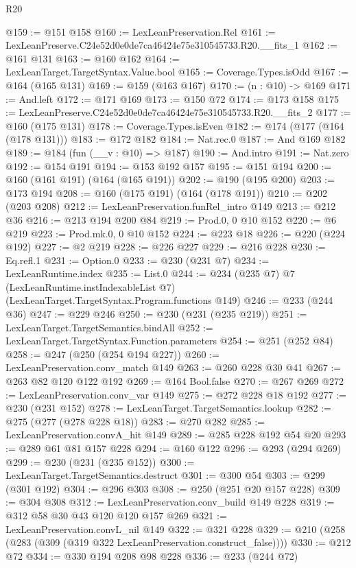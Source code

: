 \begin{lexlean}{R20}
\begin{coremodule}
@159 := @151 @158
@160 := LexLeanPreservation.Rel
@161 := LexLeanPreserve.C24e52d0e0de7ca46424e75e310545733.R20.__fits_1
@162 := @161 @131
@163 := @160 @162
@164 := LexLeanTarget.TargetSyntax.Value.bool
@165 := Coverage.Types.isOdd
@167 := @164 (@165 @131)
@169 := @159 (@163 @167)
@170 := (n : @10) -> @169
@171 := And.left
@172 := @171 @169
@173 := @150 @72
@174 := @173 @158
@175 := LexLeanPreserve.C24e52d0e0de7ca46424e75e310545733.R20.__fits_2
@177 := @160 (@175 @131)
@178 := Coverage.Types.isEven
@182 := @174 (@177 (@164 (@178 @131)))
@183 := @172 @182
@184 := Nat.rec.{0}
@187 := And @169 @182
@189 := @184 (fun (__v : @10) => @187)
@190 := And.intro
@191 := Nat.zero
@192 := @154 @191
@194 := @153 @192 @157
@195 := @151 @194
@200 := @160 (@161 @191) (@164 (@165 @191))
@202 := @190 (@195 @200)
@203 := @173 @194
@208 := @160 (@175 @191) (@164 (@178 @191))
@210 := @202 (@203 @208)
@212 := LexLeanPreservation.funRel_intro @149
@213 := @212 @36
@216 := @213 @194 @200 @84
@219 := Prod.{0, 0} @10 @152
@220 := @6 @219
@223 := Prod.mk.{0, 0} @10 @152
@224 := @223 @18
@226 := @220 (@224 @192)
@227 := @2 @219
@228 := @226 @227
@229 := @216 @228
@230 := Eq.refl.{1}
@231 := Option.{0}
@233 := @230 (@231 @7)
@234 := LexLeanRuntime.index
@235 := List.{0}
@244 := @234
    (@235 @7)
    @7
    (LexLeanRuntime.instIndexableList @7)
    (LexLeanTarget.TargetSyntax.Program.functions @149)
@246 := @233 (@244 @36)
@247 := @229 @246
@250 := @230 (@231 (@235 @219))
@251 := LexLeanTarget.TargetSemantics.bindAll
@252 := LexLeanTarget.TargetSyntax.Function.parameters
@254 := @251 (@252 @84)
@258 := @247 (@250 (@254 @194 @227))
@260 := LexLeanPreservation.conv_match @149
@263 := @260 @228 @30 @41
@267 := @263 @82 @120 @122 @192
@269 := @164 Bool.false
@270 := @267 @269
@272 := LexLeanPreservation.conv_var @149
@275 := @272 @228 @18 @192
@277 := @230 (@231 @152)
@278 := LexLeanTarget.TargetSemantics.lookup
@282 := @275 (@277 (@278 @228 @18))
@283 := @270 @282
@285 := LexLeanPreservation.convA_hit @149
@289 := @285 @228 @192 @54 @20
@293 := @289 @61 @81 @157 @228
@294 := @160 @122
@296 := @293 (@294 @269)
@299 := @230 (@231 (@235 @152))
@300 := LexLeanTarget.TargetSemantics.destruct
@301 := @300 @54
@303 := @299 (@301 @192)
@304 := @296 @303
@308 := @250 (@251 @20 @157 @228)
@309 := @304 @308
@312 := LexLeanPreservation.conv_build @149 @228
@319 := @312 @58 @30 @43 @120 @120 @157 @269
@321 := LexLeanPreservation.convL_nil @149
@322 := @321 @228
@329 := @210 (@258 (@283 (@309 (@319 @322 LexLeanPreservation.construct_false))))
@330 := @212 @72
@334 := @330 @194 @208 @98 @228
@336 := @233 (@244 @72)

\end{coremodule}
\end{lexlean}

